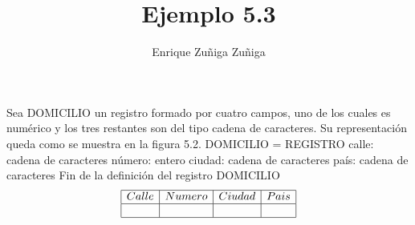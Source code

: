 \documentclass[11pt]{amsart}
\title{Ejemplo 5.3 }
\author{Enrique Zuñiga Zuñiga}
\begin{document}
\maketitle
\noindent Sea DOMICILIO un registro formado por cuatro campos, uno de los cuales es numérico y los tres restantes son del tipo cadena de caracteres. Su representación queda como se muestra en la figura 5.2.  \newline\newline
DOMICILIO = REGISTRO  \newline
calle: cadena de caracteres   \newline
número: entero  \newline
ciudad: cadena de caracteres  \newline
país: cadena de caracteres \newline
{Fin de la definición del registro DOMICILIO}  \newline
$$
\begin{array}{|c|c|c|c|}
\hline
Calle           & Numero  & Ciudad  & Pais \\
\hline
  &   &  &  \\
\hline
\end{array}
$$
\end{document}
